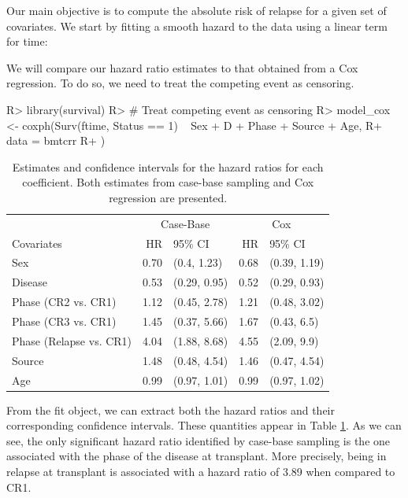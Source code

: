 \documentclass[
]{jss}
\begin{document}
Our main objective is to compute the absolute risk of relapse for a
given set of covariates. We start by fitting a smooth hazard to the data
using a linear term for time:

We will compare our hazard ratio estimates to that obtained from a Cox
regression. To do so, we need to treat the competing event as censoring.

\begin{CodeChunk}

\begin{CodeInput}
R> library(survival)
R> # Treat competing event as censoring
R> model_cox <- coxph(Surv(ftime, Status == 1) ~ Sex + D + Phase + Source + Age,
R+   data = bmtcrr
R+ )
\end{CodeInput}
\end{CodeChunk}

\begin{CodeChunk}
\begin{table}

\caption{\label{tab:bmtcrr-cis}Estimates and confidence intervals for the hazard ratios for each coefficient. Both estimates from case-base sampling and Cox regression are presented.}
\centering
\begin{tabular}[t]{lrlrl}
\toprule
\multicolumn{1}{c}{ } & \multicolumn{2}{c}{Case-Base} & \multicolumn{2}{c}{Cox} \\
\cmidrule(l{3pt}r{3pt}){2-3} \cmidrule(l{3pt}r{3pt}){4-5}
Covariates & HR & 95\% CI & HR & 95\% CI\\
\midrule
Sex & 0.70 & (0.4, 1.23) & 0.68 & (0.39, 1.19)\\
Disease & 0.53 & (0.29, 0.95) & 0.52 & (0.29, 0.93)\\
Phase (CR2 vs. CR1) & 1.12 & (0.45, 2.78) & 1.21 & (0.48, 3.02)\\
Phase (CR3 vs. CR1) & 1.45 & (0.37, 5.66) & 1.67 & (0.43, 6.5)\\
Phase (Relapse vs. CR1) & 4.04 & (1.88, 8.68) & 4.55 & (2.09, 9.9)\\
\addlinespace
Source & 1.48 & (0.48, 4.54) & 1.46 & (0.47, 4.54)\\
Age & 0.99 & (0.97, 1.01) & 0.99 & (0.97, 1.02)\\
\bottomrule
\end{tabular}
\end{table}

\end{CodeChunk}

From the fit object, we can extract both the hazard ratios and their
corresponding confidence intervals. These quantities appear in Table
\ref{tab:bmtcrr-cis}. As we can see, the only significant hazard ratio
identified by case-base sampling is the one associated with the phase of
the disease at transplant. More precisely, being in relapse at
transplant is associated with a hazard ratio of 3.89 when compared to
CR1.
\end{document}

